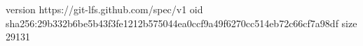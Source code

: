 version https://git-lfs.github.com/spec/v1
oid sha256:29b332b6be5b43f3fe1212b575044ea0ccf9a49f6270cc514eb72c66cf7a98df
size 29131
